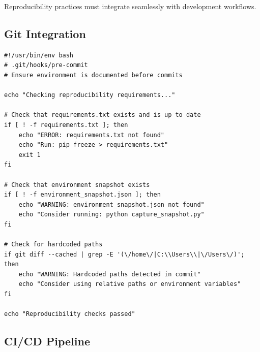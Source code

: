 Reproducibility practices must integrate seamlessly with development workflows.

\subsection{Git Integration}

\begin{lstlisting}[style=shell, caption={Git hooks for reproducibility}]
#!/usr/bin/env bash
# .git/hooks/pre-commit
# Ensure environment is documented before commits

echo "Checking reproducibility requirements..."

# Check that requirements.txt exists and is up to date
if [ ! -f requirements.txt ]; then
    echo "ERROR: requirements.txt not found"
    echo "Run: pip freeze > requirements.txt"
    exit 1
fi

# Check that environment snapshot exists
if [ ! -f environment_snapshot.json ]; then
    echo "WARNING: environment_snapshot.json not found"
    echo "Consider running: python capture_snapshot.py"
fi

# Check for hardcoded paths
if git diff --cached | grep -E '(\/home\/|C:\\Users\\|\/Users\/)'; then
    echo "WARNING: Hardcoded paths detected in commit"
    echo "Consider using relative paths or environment variables"
fi

echo "Reproducibility checks passed"
\end{lstlisting}

\subsection{CI/CD Pipeline}


